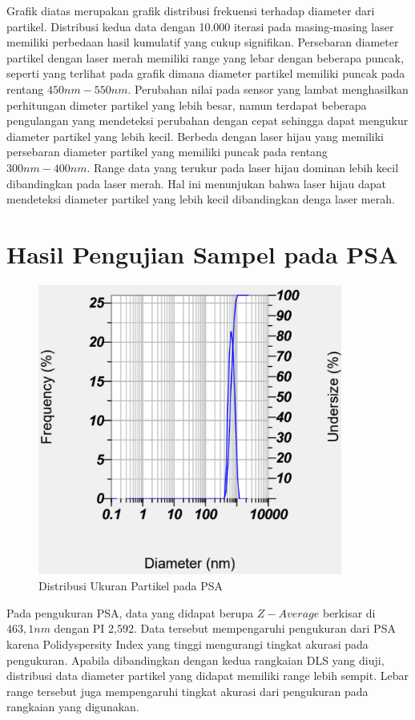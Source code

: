 Grafik diatas merupakan grafik distribusi frekuensi terhadap
diameter dari partikel. Distribusi kedua data dengan 10.000
iterasi pada masing-masing laser memiliki perbedaan hasil
kumulatif yang cukup signifikan. Persebaran diameter partikel
dengan laser merah memiliki range yang lebar dengan beberapa
puncak, seperti yang terlihat pada grafik dimana diameter
partikel memiliki puncak pada rentang ${450nm-550nm}$. Perubahan
nilai pada sensor yang lambat menghasilkan perhitungan dimeter
partikel yang lebih besar, namun terdapat beberapa pengulangan
yang mendeteksi perubahan dengan cepat sehingga dapat mengukur
diameter partikel yang lebih kecil. Berbeda dengan laser hijau
yang memiliki persebaran diameter partikel yang memiliki puncak
pada rentang ${300nm-400nm}$. Range data yang terukur pada laser
hijau dominan lebih kecil dibandingkan pada laser merah. Hal ini
menunjukan bahwa laser hijau dapat mendeteksi diameter partikel
yang lebih kecil dibandingkan denga laser merah.



\section{Hasil Pengujian Sampel pada PSA}
\begin{figure}[H]
  \centering
  \includegraphics[width=10cm]{Images/SiO2PSA.png}
  \caption{Distribusi Ukuran Partikel pada PSA}
  \label{fig:psa}
\end{figure}
Pada pengukuran PSA, data yang didapat berupa ${Z-Average}$ berkisar
di ${463,1 nm}$ dengan PI 2,592. Data tersebut mempengaruhi pengukuran
dari PSA karena Polidyspersity Index yang tinggi mengurangi tingkat
akurasi pada pengukuran. Apabila dibandingkan dengan kedua rangkaian
DLS yang diuji, distribusi data diameter partikel yang didapat
memiliki range lebih sempit. Lebar range tersebut juga mempengaruhi
tingkat akurasi dari pengukuran pada rangkaian yang digunakan.



